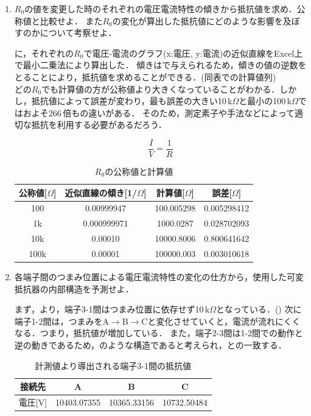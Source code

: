 \newpage
\begin{enumerate}[実習3-1：]
\item $R_{0}$の値を変更した時のそれぞれの電圧電流特性の傾きから抵抗値を求め．公称値と比較せよ．
また$R_{0}$の変化が算出した抵抗値にどのような影響を及ぼすのかについて考察せよ．

に，それぞれの$R_{0}$で電圧-電流のグラフ(x:電圧, y:電流)の近似直線をExcel上で最小二乗法により算出した．
傾きはで与えられるため，傾きの値の逆数をとることにより，抵抗値を求めることができる．(同表での計算値列)\\
どの$R_{0}$でも計算値の方が公称値より大きくなっていることがわかる．しかし，抵抗値によって誤差が変わり，最も誤差の大きい10\,k\rm{$\Omega$}と最小の100\,k\rm{$\Omega$}ではおよそ266\,倍もの違いがある．
そのため，測定素子や手法などによって適切な抵抗を利用する必要があるだろう．

\begin{equation}
\frac{I}{V}=\frac{1}{R}
\label{eq:1/R}
\end{equation}

\begin{table}[h]
\centering
\caption{$R_{0}$の公称値と計算値}
\label{tab:sqr-R0}
\begin{tabular}{cccc}
\hline
公称値[\rm{$\Omega$}]  & 近似直線の傾き[\rm{1/$\Omega$}]   & 計算値[\rm{$\Omega$}]  &誤差[\rm{$\Omega$}] \\
\hline
100  & 0.00999947  & 100.005298 & 0.005298412 \\
1k   & 0.000999971 & 1000.0287 & 0.028702093 \\
10k  & 0.00010     & 10000.8006 & 0.800641642 \\
100k & 0.00001     & 100000.003 & 0.003010618 \\
\hline
\end{tabular}
\end{table}
\item 各端子間のつまみ位置による電圧電流特性の変化の仕方から，使用した可変抵抗器の内部構造を予測せよ．

まず，より，端子3-1間はつまみ位置に依存せず10\,k\rm{$\Omega$}となっている．()
次に端子1-2間は，つまみをA$\to$B$\to$Cと変化させていくと，電流が流れにくくなる．つまり，抵抗値が増加している．
また，端子2-3間は1-2間での動作と逆の動きであるため，のような構造であると考えられ，との一致する．

\begin{table}[h]
\centering
\caption{計測値より導出される端子3-1間の抵抗値}
\label{tab:3-1R}
\begin{tabular}{cccc}
\hline
接続先&A&B&C\\
\hline
電圧[\rm{V}] & 10403.07355 &10365.33156 & 10732.50484\\
\hline
\end{tabular}
\end{table}


\end{enumerate}
